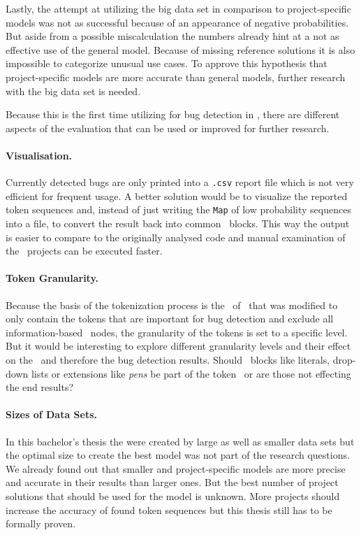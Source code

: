 Lastly, the attempt at utilizing the big data set in comparison to project-specific models was not as successful because of an appearance of negative probabilities. But aside from a possible miscalculation the numbers already hint at a not as effective use of the general model. Because of missing reference solutions it is also impossible to categorize unusual use cases. To approve this hypothesis that project-specific models are more accurate than general models, further research with the big data set is needed.

Because this is the first time utilizing  for bug detection in \scratch{}, there are different aspects of the evaluation that can be used or improved for further research. 


\paragraph{Visualisation.}
Currently detected bugs are only printed into a \texttt{.csv} report file which is not very efficient for frequent usage. A better solution would be to visualize the reported token sequences and, instead of just writing the \texttt{Map} of low probability sequences into a file, to convert the result back into common \scratch\ blocks. This way the output is easier to compare to the originally analysed code and manual examination of the \scratch\ projects can be executed faster. 

\paragraph{Token Granularity.}
Because the basis of the tokenization process is the \AST\ of \litterbox\ that was modified to only contain the tokens that are important for bug detection and exclude all information-based \AST\ nodes, the granularity of the tokens is set to a specific level. But it would be interesting to explore different granularity levels and their effect on the \ngram\ and therefore the bug detection results. Should \scratch\ blocks like literals, drop-down lists or extensions like \textit{pens} be part of the token \AST\ or are those not effecting the end results? 

\paragraph{Sizes of Data Sets.}
In this bachelor's thesis the  were created by large as well as smaller data sets but the optimal size to create the best model was not part of the research questions. We already found out that smaller and project-specific models are more precise and accurate in their results than larger ones. But the best number of project solutions that should be used for the model is unknown. More projects should increase the accuracy of found token sequences but this thesis still has to be formally proven.  

